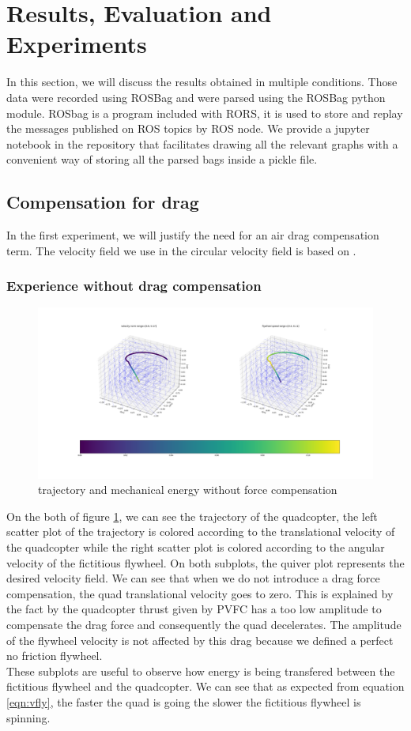 \section{Results, Evaluation and Experiments}
In this section, we will discuss the results obtained in multiple conditions. Those data were recorded using ROSBag and were parsed using the ROSBag python module.
ROSbag is a program included with RORS, it is used to store and replay the messages published on ROS topics by ROS node.
We provide a jupyter notebook in the repository that facilitates drawing all the relevant graphs with a convenient way of storing all the parsed bags inside a pickle file.

\subsection{Compensation for drag}
In the first experiment, we will justify the need for an air drag compensation term. 
The velocity field we use in the circular velocity field is based on \cite{mcinnes2003velocity}.
\subsubsection{Experience without drag compensation}
\begin{figure}[h!]
   \centering
   \includegraphics[width=\linewidth]{Images/python-noforcecomp.png}
   \caption{trajectory and mechanical energy without force compensation }
   \label{fig:pythonnocomp}
\end{figure}
On the both of figure \ref{fig:pythonnocomp}, we can see the trajectory of the quadcopter, the left scatter plot of the trajectory is colored according to the
translational velocity of the quadcopter while the right scatter plot is colored according to the angular velocity of the fictitious flywheel.
On both subplots, the quiver plot represents the desired velocity field.
We can see that when we do not introduce a drag force compensation, the quad translational velocity goes to zero. 
This is explained by the fact by the quadcopter thrust given by PVFC has a too low amplitude to compensate the drag force and consequently the quad decelerates.
The amplitude of the flywheel velocity is not affected by this drag because we defined a perfect no friction flywheel.\\
These subplots are useful to observe how energy is being transfered between the fictitious flywheel and the quadcopter. 
We can see that as expected from equation \ref{eqn:vfly}, the faster the quad is going the slower the fictitious flywheel is spinning.

